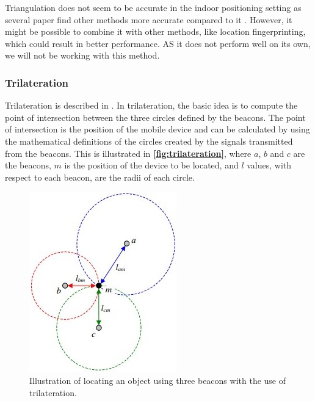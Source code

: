 Triangulation does not seem to be accurate in the indoor positioning setting as several paper find other methods more accurate compared to it \cite{triangulation02}\cite{triangulation03trilat}. However, it might be possible to combine it with other methods, like location fingerprinting, which could result in better performance\cite{triangulation4}. AS it does not perform well on its own, we will not be working with this method.

\subsubsection{Trilateration} \label{sec:trilateration} 
Trilateration is described in \cite{Triangulation}. In trilateration, the basic idea is to compute the point of intersection between the three circles defined by the beacons. The point of intersection is the position of the mobile device and can be calculated by using the mathematical definitions of the circles created by the signals transmitted from the beacons. This is illustrated in \textbf{\autoref{fig:trilateration}}, where $a$, $b$ and $c$ are the beacons, $m$ is the position of the device to be located, and $l$ values, with respect to each beacon, are the radii of each circle.

\begin{figure}[H]
    \centering
    \includegraphics[scale=0.8]{Images/ProblemAnalysis/trilateration.jpg}
    \caption{Illustration of locating an object using three beacons with the use of trilateration\cite{Triangulation}.}
    \label{fig:trilateration}
\end{figure}

